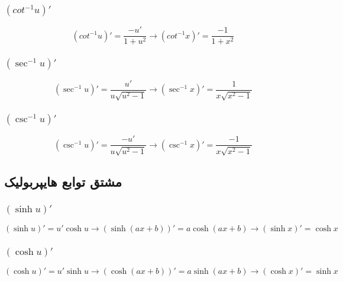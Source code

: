 \subsubsection{$(cot^{-1} u)'$}
\[ (cot^{-1} u)' = \frac{-u'}{1+u^2} \to (cot^{-1}x)' = \frac{-1}{1+x^2} \]

\subsubsection{$(\sec^{-1}u)'$}
\[ (\sec^{-1}u)' = \frac{u'}{u\sqrt{u^2-1}} \to (\sec^{-1}x)' = \frac{1}{x\sqrt{x^2-1}} \]

\subsubsection{$(\csc^{-1}u)'$}
\[ (\csc^{-1}u)' = \frac{-u'}{u\sqrt{u^2-1}} \to (\csc^{-1}x)' = \frac{-1}{x\sqrt{x^2-1}} \]


\subsection{مشتق توابع هایپربولیک}
\subsubsection{$(\sinh u)'$}
\[ (\sinh u)' = u'\cosh u \to (\sinh(ax+b))' = a\cosh(ax+b) \to (\sinh x)' = \cosh x \]

\subsubsection{$(\cosh u)'$}
\[ (\cosh u)' = u'\sinh u \to (\cosh(ax+b))' = a\sinh(ax+b) \to (\cosh x)' = \sinh x \]

